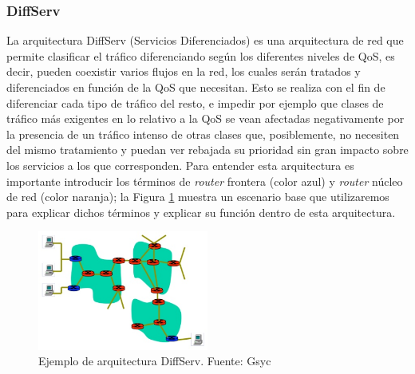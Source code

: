 	\subsubsection{DiffServ} 
	La arquitectura DiffServ (Servicios Diferenciados) es una arquitectura de red que permite clasificar el tráfico diferenciando según los diferentes niveles de QoS, es decir, pueden coexistir varios flujos en la red, los cuales serán tratados y diferenciados en función de la QoS que necesitan. Esto se realiza con el fin de diferenciar cada tipo de tráfico del resto, e impedir por ejemplo que clases de tráfico más exigentes en lo relativo a la QoS se vean afectadas negativamente por la presencia de un tráfico intenso de otras clases que, posiblemente, no necesiten del mismo tratamiento y puedan ver rebajada su prioridad sin gran impacto sobre los servicios a los que corresponden. Para entender esta arquitectura es importante introducir los términos de \textit{router} frontera (color azul) y \textit{router} núcleo de red (color naranja); la Figura \ref{diffserv} muestra un escenario base que utilizaremos para explicar dichos términos y explicar su función dentro de esta arquitectura.
	
	\begin{figure}[H]
			\centering
			\includegraphics[width=0.5\textwidth]{img/diffserv.PNG}
			\caption{Ejemplo de arquitectura DiffServ. Fuente: Gsyc}
			\label{diffserv}
		\end{figure}
	
